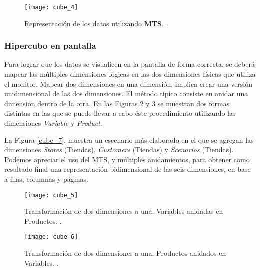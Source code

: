 \documentclass[a4paper,11pt]{article}
\begin{document}
    \begin{figure}
      \begin{center}
        \texttt{[image: cube\_4]}
        \caption{Representación de los datos utilizando \textbf{MTS}. \cite[p.~55]{olap_solutions}.}
        \label{cube_4}
      \end{center}
    \end{figure}
    
    
    \subsubsection{Hipercubo en pantalla}
    
    Para lograr que los datos se visualicen en la pantalla de forma correcta, se deberá mapear las múltiples dimensiones lógicas en las dos dimensiones físicas
    que utiliza el monitor.
    Mapear dos dimensiones en una dimensión, implica crear una versión unidimensional de las dos dimensiones.
    El método típico consiste en anidar una dimensión dentro de la otra. En las Figuras \ref{cube_5} y \ref{cube_6} se muestran dos formas distintas en las que
    se puede llevar a cabo éste procedimiento utilizando las dimensiones \textit{Variable} y \textit{Product}.
    
    La Figura \ref{cube_7}, muestra un escenario más elaborado en el que se agregan las dimensiones \textit{Stores} (Tiendas), \textit{Customers} (Tiendas)
    y \textit{Scenarios} (Tiendas). Podemos apreciar el uso del MTS, y múltiples anidamientos, para obtener como resultado final una representación
    bidimensional de las seis dimensiones, en base a filas, columnas y páginas.
    
    \begin{figure}
      \begin{center}
        \texttt{[image: cube\_5]}
        \caption{Transformación de dos dimensiones a una. Variables anidadas en Productos. \cite[p.~58]{olap_solutions}.}
        \label{cube_5}
      \end{center}
    \end{figure}
    
    \begin{figure}
      \begin{center}
        \texttt{[image: cube\_6]}
        \caption{Transformación de dos dimensiones a una. Productos anidados en Variables. \cite[p.~58]{olap_solutions}.}
        \label{cube_6}
      \end{center}
    \end{figure}
    
\end{document}
